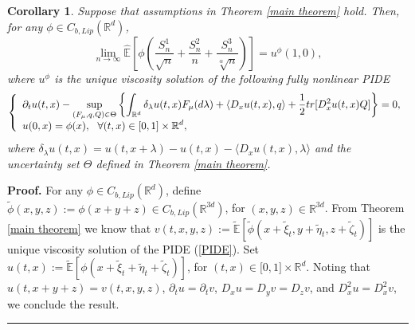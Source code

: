 \documentclass[a4paper,oneside,10pt]{article}%
\newtheorem{corollary}[theorem]{Corollary}
\newenvironment{proof}[1][Proof]{\noindent \textbf{#1.} }{\  \rule{0.5em}{0.5em}}
\numberwithin{equation}{section}
\begin{document}
\begin{corollary}
Suppose that assumptions in Theorem \ref{main theorem} hold. Then, for any
$\phi \in C_{b,Lip}(\mathbb{R}^{d})$,
\[
\lim_{n\rightarrow \infty}\mathbb{\hat{E}}\left[  \phi \left(  \frac{S_{n}^{1}
}{\sqrt{n}}+\frac{S_{n}^{2}}{n}+\frac{S_{n}^{3}}{\sqrt[\alpha]{n}}\right)
\right]  =u^{\phi}(1,0),
\]
where $u^{\phi}$ is the unique viscosity solution of the following fully
nonlinear PIDE
\[
\left \{
\begin{array}
[c]{l}%
\displaystyle \partial_{t}u(t,x)-\sup \limits_{(F_{\mu},q,Q)\in \Theta}\left \{
\int_{\mathbb{R}^{d}}\delta_{\lambda}u(t,x)F_{\mu}(d\lambda) +\langle
D_{x}u(t,x),q\rangle+\frac{1}{2}tr[D_{x}^{2}u(t,x)Q]\right \}  =0,\\
\displaystyle u(0,x)=\phi(x),\text{ \ }\forall(t,x)\in[0,1]\times \mathbb{R}
^{d},
\end{array}
\right.
\]
where $\delta_{\lambda}u(t,x)=u(t,x+\lambda)-u(t,x)-\langle D_{x}%
u(t,x),\lambda \rangle$ and the uncertainty set $\Theta$ defined in Theorem
\ref{main theorem}.

\end{corollary}

\begin{proof}
For any $\phi \in C_{b,Lip}(\mathbb{R}^{d})$, define $\tilde{\phi}%
(x,y,z):=\phi(x+y+z)\in C_{b,Lip}(\mathbb{R}^{3d})$, for $(x,y,z)\in
\mathbb{R}^{3d}$. From Theorem \ref{main theorem} we know that
$v(t,x,y,z):=\mathbb{\tilde{E}}[\tilde{\phi}(x+\tilde{\xi}_{t},y+\tilde{\eta
}_{t},z+\tilde{\zeta}_{t})]$ is the unique viscosity solution of the PIDE
(\ref{PIDE}). Set $u(t,x):=\mathbb{\tilde{E}}[\phi(x+\tilde{\xi}_{t}%
+\tilde{\eta}_{t}+ \tilde{\zeta}_{t})]$, for $(t,x)\in \lbrack0,1]\times
\mathbb{R}^{d}$. Noting that $u(t,x+y+z)=v(t,x,y,z)$, $\partial_{t}%
u=\partial_{t}v$, $D_{x}u=D_{y}v=D_{z}v$, and $D_{x}^{2}u=D_{x}^{2}v$, we
conclude the result.
\end{proof}
\end{document}
